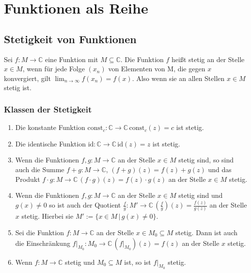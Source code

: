 \documentclass[a4paper,12pt]{article}
\begin{document}
\section{Funktionen als Reihe}
\subsection{Stetigkeit von Funktionen}
Sei $f:M\rightarrow \mathbb{C}$ eine Funktion mit $M\subseteq \mathbb{C}$. Die Funktion $f$ heißt stetig an der Stelle $x \in M$, wenn für jede Folge $\left(x_n\right)$ von Elementen von M, die gegen $x$ konvergiert, gilt $\lim_{n\rightarrow \infty}f\left(x_n\right)=f\left(x\right)$. Also wenn sie an allen Stellen $x \in M$ stetig ist.

\subsubsection{Klassen der Stetigkeit}
\begin{enumerate}[label=(\alph*)]
        \item Die konstante Funktion $\text{const}_c:\mathbb{C}\rightarrow \mathbb{C}\,\text{const}_c\left(z\right)=c$ ist stetig.
        \item Die identische Funktion $\text{id}:\mathbb{C}\rightarrow \mathbb{C}\,\text{id}\left(z\right)=z$ ist stetig.
        \item Wenn die Funktionen $f,g:M\rightarrow \mathbb{C}$ an der Stelle $x \in M$ stetig sind, so sind auch die Summe $f+g:M\rightarrow \mathbb{C}$, $\left(f+g\right)\left(z\right)=f\left(z\right)+g\left(z\right)$ und das Produkt $f\cdot g:M\rightarrow \mathbb{C}\,\left(f\cdot g\right)\left(z\right)=f\left(z\right)\cdot g\left(z\right)$ an der Stelle $x \in M$ stetig.
        \item Wenn die Funktionen $f,g:M\rightarrow \mathbb{C}$ an der Stelle $x \in M$ stetig sind und $g\left(x\right)\neq 0$ so ist auch der Quotient $\tfrac{f}{g}:M'\rightarrow \mathbb{C}\,\left(\tfrac{f}{g}\right)\left(z\right)=\tfrac{f\left(z\right)}{g\left(z\right)}$ an der Stelle $x$ stetig. Hierbei sie $M':=\{x \in M\,|\, g\left(x\right)\neq 0\}$.
        \item Sei die Funktion $f:M\rightarrow \mathbb{C}$ an der Stelle $x \in M_0\subseteq M$ stetig. Dann ist auch die Einschränkung $f|_{M_0}:M_0\rightarrow \mathbb{C}\,\left(f|_{M_0}\right)\left(z\right)=f\left(z\right)$ an der Stelle $x$ stetig.
        \item Wenn $f:M\rightarrow \mathbb{C}$ stetig und $M_0\subseteq M$ ist, so ist $f|_{M_0}$ stetig.
\end{enumerate}
\end{document}
